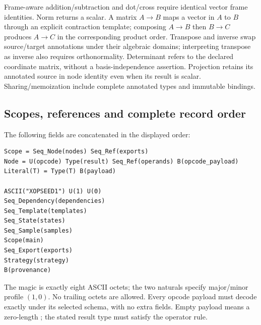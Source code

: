 Frame-aware addition/subtraction and dot/cross require identical vector frame
identities. Norm returns a scalar. A matrix $A\to B$ maps a vector in $A$ to $B$
through an explicit contraction template; composing $A\to B$ then $B\to C$
produces $A\to C$ in the corresponding product order. Transpose and inverse
swap source/target annotations under their algebraic domains; interpreting
transpose as inverse also requires orthonormality. Determinant refers to the
declared coordinate matrix, without a basis-independence assertion. Projection
retains its annotated source in node identity even when its result is scalar.
Sharing/memoization include complete annotated types and immutable bindings.

\subsection{Scopes, references and complete record order}
The following fields are concatenated in the displayed order:
\begin{lstlisting}
Scope = Seq_Node(nodes) Seq_Ref(exports)
Node = U(opcode) Type(result) Seq_Ref(operands) B(opcode_payload)
Literal(T) = Type(T) B(payload)

ASCII("XOPSEED1") U(1) U(0)
Seq_Dependency(dependencies)
Seq_Template(templates)
Seq_State(states)
Seq_Sample(samples)
Scope(main)
Seq_Export(exports)
Strategy(strategy)
B(provenance)
\end{lstlisting}
The magic is exactly eight ASCII octets; the two naturals specify major/minor
profile $(1,0)$. No trailing octets are allowed. Every opcode payload must decode
exactly under its selected schema, with no extra fields. Empty payload means
a zero-length ; the stated result type must satisfy the operator rule.

